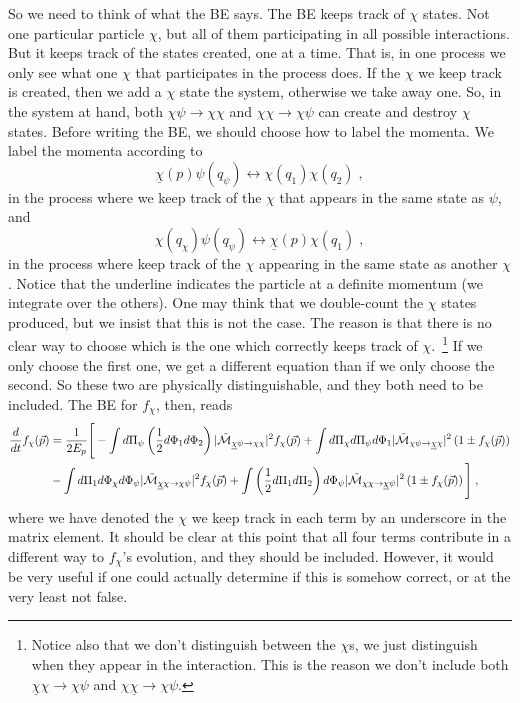 \documentclass[11pt,a4paper]{article}
\begin{document}
So we need to think of what the BE says. The BE keeps track of $\chi$ states. Not one particular particle $\chi$, but all of them participating in all possible interactions. But it keeps track of the states created, one at a time. That is, in one process we only see what one $\chi$ that participates in the process does. If the $\chi$ we keep track  is created, then we add a $\chi$ state the system, otherwise we take away one. So, in the system at hand, both $\chi \psi \to \chi \chi $ and $\chi \chi \to \chi \psi $ can create and destroy $\chi$ states. Before writing the BE, we should choose how to label the momenta. We label the momenta according to
%
$$
\underline{\chi}(p) \psi(q_\psi) \leftrightarrow \chi(q_1)\chi(q_2) \; ,
$$
in the process where we keep track of the $\chi$ that appears in the same state as $\psi$, and 
%
$$
\chi(q_\chi) \psi(q_\psi) \leftrightarrow \underline{\chi}(p)\chi(q_1) \; ,
$$
%
in the process where keep track of the $\chi$ appearing in the same state as another $\chi$. Notice that the underline indicates the particle at a definite momentum (we integrate over the others). One may think that we double-count the $\chi$ states produced, but we insist that this is not the case. The reason is that there is no clear way to choose which is the one which correctly keeps track of $\chi$.~\footnote{Notice also that we don't distinguish between the $\chi$s, we just distinguish when they appear in the interaction. This is the reason we don't include both   $\underline{\chi} \chi \to \chi \psi$ and $\chi\underline{\chi}  \to \chi \psi$. }  If we only choose the first one, we get a different equation than if we only choose the second. So these two are physically distinguishable, and they both need to be included. The BE for $f_\chi$, then, reads
%
\begin{eqnarray}
\dfrac{d}{dt} f_{\chi }(\vec{p}) &= \dfrac{1}{2E_p} \lrBiggsb{
	-\dint d\Pi_{\psi} \lrb{\dfrac{1}{2} d\Phi_{1} d\Phi_{2}}   \tM{\underline{\chi} \psi}{\chi \chi } f_{\chi }(\vec{p} )
	+ \dint d\Pi_{\chi} d\Pi_{\psi} d\Phi_{1}  \tM{\chi \psi }{\underline{\chi} \chi} \lrb{1\pm f_{\chi }(\vec{p})} 
	\nonumber \\
	&- \dint d\Pi_{1} d\Phi_{\chi} d\Phi_{\psi}   \tM{\underline{\chi} \chi}{\chi \psi } f_{\chi }(\vec{p})
	+ \dint \lrb{\dfrac{1}{2} d\Pi_{1} d\Pi_{2}} d\Phi_{\psi}  \tM{\chi \chi }{\underline{\chi} \psi} \lrb{1\pm f_{\chi }(\vec{p})}
} \;,
%
\label{eq:BE_22-chi}
\end{eqnarray}  
%
where we have denoted the $\chi$ we keep track in each term by an underscore in the matrix element. It should be clear at this point that all four terms contribute in a different way to $f_\chi$'s evolution, and they should be included. However, it would be very useful if one could actually determine if this is somehow correct, or at the very least not false.
\end{document}
